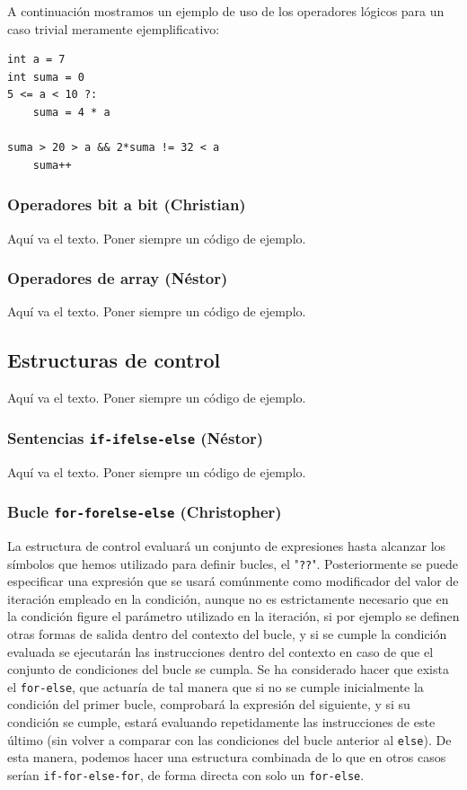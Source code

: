 \documentclass[11pt, english]{article}
\begin{document}
A continuación mostramos un ejemplo de uso de los operadores lógicos para un caso trivial meramente ejemplificativo:
\begin{lstlisting}[frame=single]
int a = 7
int suma = 0
5 <= a < 10 ?:
	suma = 4 * a
	
suma > 20 > a && 2*suma != 32 < a 
	suma++
\end{lstlisting}


\subsubsection{Operadores bit a bit (Christian)}
Aquí va el texto. Poner siempre un código de ejemplo.

\subsubsection{Operadores de array (Néstor)}
Aquí va el texto. Poner siempre un código de ejemplo.
\newpage

\subsection{Estructuras de control}
Aquí va el texto. Poner siempre un código de ejemplo.

\subsubsection{Sentencias \texttt{if-ifelse-else} (Néstor)}
Aquí va el texto. Poner siempre un código de ejemplo.

\subsubsection{Bucle \texttt{for-forelse-else} (Christopher)}
La estructura de control evaluará un conjunto de expresiones hasta alcanzar los símbolos que hemos utilizado para definir bucles, el "\texttt{??}". Posteriormente se puede especificar una expresión que se usará comúnmente como modificador del valor de iteración empleado en la condición, aunque no es estrictamente necesario que en la condición figure el parámetro utilizado en la iteración, si por ejemplo se definen otras formas de salida dentro del contexto del bucle, y si se cumple la condición evaluada se ejecutarán las instrucciones dentro del contexto en caso de que el conjunto de condiciones del bucle se cumpla. Se ha considerado hacer que exista el \texttt{for-else}, que actuaría de tal manera que si no se cumple inicialmente la condición del primer bucle, comprobará la expresión del siguiente, y si su condición se cumple, estará evaluando repetidamente las instrucciones de este último (sin volver a comparar con las condiciones del bucle anterior al \texttt{else}). De esta manera, podemos hacer una estructura combinada de lo que en otros casos serían \texttt{if-for-else-for}, de forma directa con solo un \texttt{for-else}. \vspace{10px}
\end{document}
